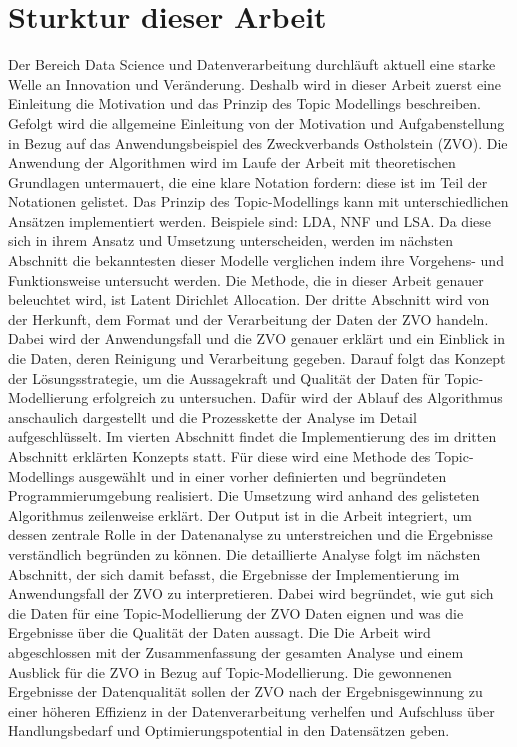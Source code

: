\documentclass[german,version-2020-11]{uzl-thesis}
\begin{document}
\section{Sturktur dieser Arbeit}
Der Bereich Data Science und Datenverarbeitung durchläuft aktuell eine starke Welle an Innovation und Veränderung. Deshalb wird in dieser Arbeit zuerst eine Einleitung die Motivation und das Prinzip des Topic Modellings beschreiben. Gefolgt wird die allgemeine Einleitung von der Motivation und Aufgabenstellung in Bezug auf das Anwendungsbeispiel des Zweckverbands Ostholstein (ZVO). Die Anwendung der Algorithmen wird im Laufe der Arbeit mit theoretischen Grundlagen untermauert, die eine klare Notation fordern: diese ist im Teil der Notationen gelistet. Das Prinzip des Topic-Modellings kann mit unterschiedlichen Ansätzen implementiert werden. Beispiele sind: LDA, NNF und LSA. Da diese sich in ihrem Ansatz und Umsetzung unterscheiden, werden im nächsten Abschnitt die bekanntesten dieser Modelle verglichen indem ihre Vorgehens- und Funktionsweise untersucht werden. Die Methode, die in dieser Arbeit genauer beleuchtet wird, ist Latent Dirichlet Allocation. Der dritte Abschnitt wird von der Herkunft, dem Format und der Verarbeitung der Daten der ZVO handeln. Dabei wird der Anwendungsfall und die ZVO genauer erklärt und ein Einblick in die Daten, deren Reinigung und Verarbeitung gegeben. Darauf folgt das Konzept der Lösungsstrategie, um die Aussagekraft und Qualität der Daten für Topic-Modellierung erfolgreich zu untersuchen. Dafür wird der Ablauf des Algorithmus anschaulich dargestellt und die Prozesskette der Analyse im Detail aufgeschlüsselt. Im vierten Abschnitt findet die Implementierung des im dritten Abschnitt erklärten Konzepts statt. Für diese wird eine Methode des Topic-Modellings ausgewählt und in einer vorher definierten und begründeten Programmierumgebung realisiert. Die Umsetzung wird anhand des gelisteten Algorithmus zeilenweise erklärt. Der Output ist in die Arbeit integriert, um dessen zentrale Rolle in der Datenanalyse zu unterstreichen und die Ergebnisse verständlich begründen zu können. Die detaillierte Analyse folgt im nächsten Abschnitt, der sich damit befasst, die Ergebnisse der Implementierung im Anwendungsfall der ZVO zu interpretieren. Dabei wird begründet, wie gut sich die Daten für eine Topic-Modellierung der ZVO Daten eignen und was die Ergebnisse über die Qualität der Daten aussagt. Die Die Arbeit wird abgeschlossen mit der Zusammenfassung der gesamten Analyse und einem Ausblick für die ZVO in Bezug auf Topic-Modellierung. Die gewonnenen Ergebnisse der Datenqualität sollen der ZVO nach der Ergebnisgewinnung zu einer höheren Effizienz in der Datenverarbeitung verhelfen und Aufschluss über Handlungsbedarf und Optimierungspotential in den Datensätzen geben.
\end{document}
